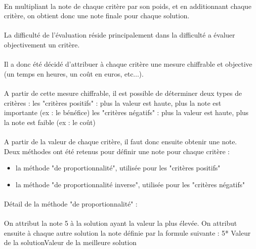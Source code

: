 \paragraph{} En multipliant la note de chaque critère par son poids, et en additionnant chaque critère, on obtient donc une note finale pour chaque solution.

\paragraph{} La difficulté de l'évaluation réside principalement dans la difficulté a évaluer objectivement un critère.

\paragraph{} Il a donc été décidé d'attribuer à chaque critère une mesure chiffrable et objective (un temps en heures, un coût en euros, etc...).

\paragraph{} A partir de cette mesure chiffrable, il est possible de déterminer deux types de critères :
les "critères positifs" : plus la valeur est haute, plus la note est importante (ex : le bénéfice)
les "critères négatifs" : plus la valeur est haute, plus la note est faible (ex : le coût)


\paragraph{} A partir de la valeur de chaque critère, il faut donc ensuite obtenir une note.
Deux méthodes ont été retenus pour définir une note pour chaque critère :
\begin{itemize}
\item la méthode "de proportionnalité", utilisée pour les "critères positifs"
\item la méthode "de proportionnalité inverse", utilisée pour les "critères négatifs"
\end{itemize}


\paragraph{} Détail de la méthode "de proportionnalité" :
\paragraph{} On attribut la note 5 à la solution ayant la valeur la plus élevée. On attribut ensuite à chaque autre solution la note définie par la formule suivante : 5* Valeur de la solutionValeur de la meilleure solution
